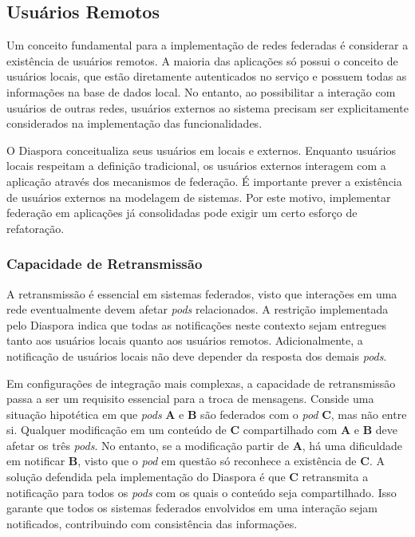 \subsection{Usuários Remotos}

Um conceito fundamental para a implementação de redes federadas é considerar a
existência de usuários remotos. A maioria das aplicações só possui o conceito de
usuários locais, que estão diretamente autenticados no serviço e possuem todas as
informações na base de dados local. No entanto, ao possibilitar a interação com
usuários de outras redes, usuários externos ao sistema precisam ser explicitamente
considerados na implementação das funcionalidades.

O Diaspora conceitualiza seus usuários em locais e externos. Enquanto usuários
locais respeitam a definição tradicional, os usuários externos interagem com a
aplicação através dos mecanismos de federação. É importante prever a existência de
usuários externos na modelagem de sistemas. Por este motivo, implementar federação
em aplicações já consolidadas pode exigir um certo esforço de refatoração. %

\subsubsection{Capacidade de Retransmissão}

A retransmissão é essencial em sistemas federados, visto que interações em uma rede
eventualmente devem afetar \textit{pods} relacionados. A restrição implementada
pelo Diaspora indica que todas as notificações neste contexto sejam entregues tanto
aos usuários locais quanto aos usuários remotos. Adicionalmente, a notificação de
usuários locais não deve depender da resposta dos demais \textit{pods}.

Em configurações de integração mais complexas, a capacidade de retransmissão passa a
ser um requisito essencial para a troca de mensagens. Conside uma situação
hipotética em que \textit{pods} \textbf{A} e \textbf{B} são federados com o
\textit{pod} \textbf{C}, mas não entre si. Qualquer modificação em um conteúdo de 
\textbf{C} compartilhado com \textbf{A} e \textbf{B} deve afetar os três 
\textit{pods}. No entanto, se a modificação partir de \textbf{A}, há uma dificuldade
em notificar \textbf{B}, visto que o \textit{pod} em questão só reconhece a 
existência de \textbf{C}. A solução defendida pela implementação do Diaspora é que
\textbf{C} retransmita a notificação para todos os \textit{pods} com os quais o
conteúdo seja compartilhado. Isso garante que todos os sistemas federados envolvidos
em uma interação sejam notificados, contribuindo com consistência das informações.

